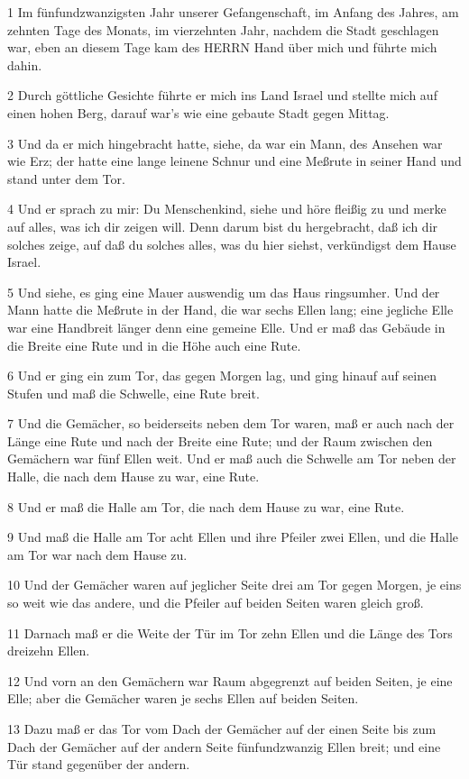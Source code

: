 \par 1 Im fünfundzwanzigsten Jahr unserer Gefangenschaft, im Anfang des Jahres, am zehnten Tage des Monats, im vierzehnten Jahr, nachdem die Stadt geschlagen war, eben an diesem Tage kam des HERRN Hand über mich und führte mich dahin.
\par 2 Durch göttliche Gesichte führte er mich ins Land Israel und stellte mich auf einen hohen Berg, darauf war's wie eine gebaute Stadt gegen Mittag.
\par 3 Und da er mich hingebracht hatte, siehe, da war ein Mann, des Ansehen war wie Erz; der hatte eine lange leinene Schnur und eine Meßrute in seiner Hand und stand unter dem Tor.
\par 4 Und er sprach zu mir: Du Menschenkind, siehe und höre fleißig zu und merke auf alles, was ich dir zeigen will. Denn darum bist du hergebracht, daß ich dir solches zeige, auf daß du solches alles, was du hier siehst, verkündigst dem Hause Israel.
\par 5 Und siehe, es ging eine Mauer auswendig um das Haus ringsumher. Und der Mann hatte die Meßrute in der Hand, die war sechs Ellen lang; eine jegliche Elle war eine Handbreit länger denn eine gemeine Elle. Und er maß das Gebäude in die Breite eine Rute und in die Höhe auch eine Rute.
\par 6 Und er ging ein zum Tor, das gegen Morgen lag, und ging hinauf auf seinen Stufen und maß die Schwelle, eine Rute breit.
\par 7 Und die Gemächer, so beiderseits neben dem Tor waren, maß er auch nach der Länge eine Rute und nach der Breite eine Rute; und der Raum zwischen den Gemächern war fünf Ellen weit. Und er maß auch die Schwelle am Tor neben der Halle, die nach dem Hause zu war, eine Rute.
\par 8 Und er maß die Halle am Tor, die nach dem Hause zu war, eine Rute.
\par 9 Und maß die Halle am Tor acht Ellen und ihre Pfeiler zwei Ellen, und die Halle am Tor war nach dem Hause zu.
\par 10 Und der Gemächer waren auf jeglicher Seite drei am Tor gegen Morgen, je eins so weit wie das andere, und die Pfeiler auf beiden Seiten waren gleich groß.
\par 11 Darnach maß er die Weite der Tür im Tor zehn Ellen und die Länge des Tors dreizehn Ellen.
\par 12 Und vorn an den Gemächern war Raum abgegrenzt auf beiden Seiten, je eine Elle; aber die Gemächer waren je sechs Ellen auf beiden Seiten.
\par 13 Dazu maß er das Tor vom Dach der Gemächer auf der einen Seite bis zum Dach der Gemächer auf der andern Seite fünfundzwanzig Ellen breit; und eine Tür stand gegenüber der andern.
